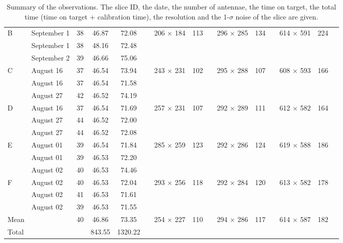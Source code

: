\documentclass[longauth]{aa}
\begin{document}
\begin{table*}
\begin{tabular}{l l c c c c c c c c c c c c c}
\hline
\multirow{3}{*}{B}&September 1  &38 & 46.87& 72.08 & & \multirow{3}{*}{206$\,\times\,$184} & \multirow{3}{*}{113} & & \multirow{3}{*}{296$\,\times\,$285} & \multirow{3}{*}{134}&  & \multirow{3}{*}{614$\,\times\,$591} & \multirow{3}{*}{224}\\
&September 1  &38 & 48.16& 72.48 \\ 
& September 2  &39 & 46.66& 75.06 \\ 
\hline
\multirow{3}{*}{C}&August 16  &37 & 46.54& 73.94 & & \multirow{3}{*}{243$\,\times\,$231} & \multirow{3}{*}{102} & & \multirow{3}{*}{295$\,\times\,$288} & \multirow{3}{*}{107}&  & \multirow{3}{*}{608$\,\times\,$593} & \multirow{3}{*}{166}\\
&August 16 &37 & 46.54& 71.58 \\ 
& August 27  &42 & 46.52& 74.19 \\ 
\hline
\multirow{3}{*}{D}
&August 16  &37 & 46.54& 71.69  & & \multirow{3}{*}{257$\,\times\,$231} & \multirow{3}{*}{107} & & \multirow{3}{*}{292$\,\times\,$289} & \multirow{3}{*}{111}&  & \multirow{3}{*}{612$\,\times\,$582} & \multirow{3}{*}{164}\\
&August 27  &44 & 46.52& 72.00 \\ 
& August 27  &44 & 46.52& 72.08 \\ 
\hline
\multirow{3}{*}{E}
&August 01  &39 & 46.54& 71.84 & & \multirow{3}{*}{285$\,\times\,$259} & \multirow{3}{*}{123} & & \multirow{3}{*}{292$\,\times\,$286} & \multirow{3}{*}{124}&  & \multirow{3}{*}{619$\,\times\,$588} & \multirow{3}{*}{186}\\
&August 01  &39 & 46.53& 72.20 \\ 
& August 02  &40 & 46.53& 74.46 \\ 
\hline
\multirow{3}{*}{F}
&August 02  &40 & 46.53& 72.04 & & \multirow{3}{*}{293$\,\times\,$256} & \multirow{3}{*}{118} & & \multirow{3}{*}{292$\,\times\,$284} & \multirow{3}{*}{120}&  & \multirow{3}{*}{613$\,\times\,$582} & \multirow{3}{*}{178}\\
&August 02  &41 & 46.53& 71.61 \\ 
& August 02  &39 & 46.53& 71.55 \\ 
\hline
Mean & & 40 & 46.86&73.35& & 254$\,\times\,$227&110& & 294$\,\times\,$286&117 & &614$\,\times\,$587&182\\
\hline
Total & & & 843.55 & 1320.22 & &&&&& \\
\hline
\hline                  
\end{tabular}
\caption{Summary of the observations. The slice ID, the date, the number of antennae, the time on target, the total time (time on target + calibration time), the resolution and the 1-$\sigma$ noise of the slice are given.}             
\label{Planning_observation}      
\end{table*}
\end{document}
